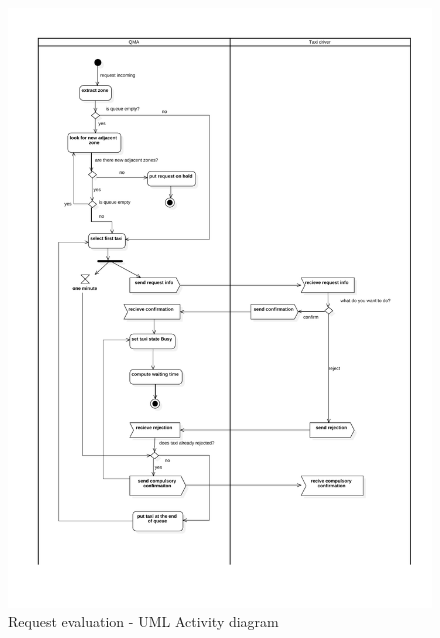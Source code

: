 \begin{figure}[H]
\begin{centering}
\includegraphics[bb=20bp 60bp 580bp 815bp,scale=0.7]{specific-requirements/3.6-other-uml/image/activity}
\par\end{centering}

\protect\caption{Request evaluation - UML Activity diagram}


\end{figure}

